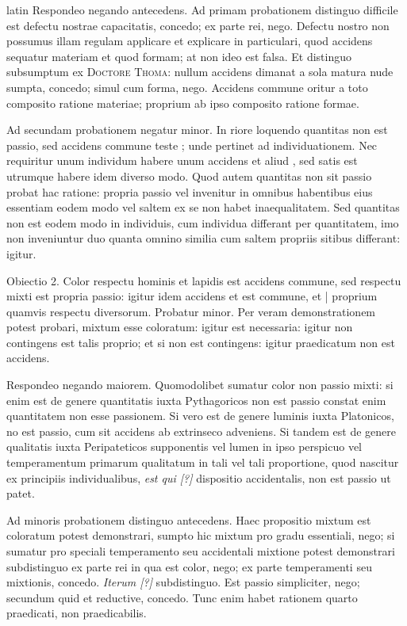\begin{otherlanguage*}{latin}
\pstart
Respondeo negando antecedens. Ad primam probationem distinguo difficile est defectu nostrae capacitatis, concedo; ex parte rei, nego. Defectu nostro non possumus illam regulam applicare et explicare in particulari, quod accidens sequatur materiam et quod formam; at non ideo est falsa. Et distinguo subsumptum ex \textsc{Doctore Thoma}:
nullum accidens dimanat a sola matura nude sumpta, concedo; simul cum forma, nego. Accidens commune oritur a toto composito ratione materiae; proprium ab ipso composito ratione formae. 
\pend

\pstart
Ad secundam probationem negatur minor. In riore loquendo quantitas non est passio, sed accidens commune teste ; unde pertinet ad individuationem. Nec requiritur unum individum habere unum accidens et aliud , sed satis est utrumque habere idem diverso modo. Quod autem quantitas non sit passio probat hac ratione:
propria passio vel invenitur in omnibus habentibus eius essentiam eodem modo vel saltem ex se non habet inaequalitatem. Sed quantitas non est eodem modo in individuis, cum individua differant per quantitatem, imo non inveniuntur duo quanta omnino similia cum saltem propriis sitibus differant:
igitur. 
\pend

\pstart
Obiectio 2. Color respectu hominis et lapidis est accidens commune, sed respectu mixti est propria passio:
igitur idem accidens et est commune, et \textnormal{|} proprium quamvis respectu diversorum. Probatur minor. Per veram demonstrationem potest probari, mixtum esse coloratum:
igitur est necessaria:
igitur non contingens est talis proprio; et si non est contingens:
igitur praedicatum non est accidens. 
\pend

\pstart
Respondeo negando maiorem. Quomodolibet sumatur color non passio mixti:
si enim est de genere quantitatis iuxta Pythagoricos non est passio constat enim quantitatem non esse passionem. Si vero est de genere luminis iuxta Platonicos, no est passio, cum sit accidens ab extrinseco adveniens. Si tandem est de genere qualitatis iuxta Peripateticos supponentis vel lumen in ipso perspicuo vel temperamentum primarum qualitatum in tali vel tali proportione, quod nascitur ex principiis individualibus, \emph{est qui [?]} dispositio accidentalis, non est passio ut patet. 
\pend

\pstart
Ad minoris probationem distinguo antecedens. Haec propositio mixtum est coloratum potest demonstrari, sumpto hic mixtum pro gradu essentiali, nego; si sumatur pro speciali temperamento seu accidentali mixtione potest demonstrari subdistinguo ex parte rei in qua est color, nego; ex parte temperamenti seu mixtionis, concedo. \emph{Iterum [?]} subdistinguo. Est passio simpliciter, nego; secundum quid et reductive, concedo. Tunc enim habet rationem quarto praedicati, non praedicabilis. 
\pend


\end{otherlanguage*}
